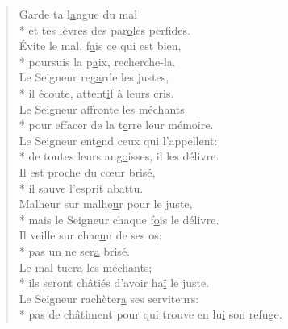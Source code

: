 \begin{verse}
Garde ta l\underline{a}ngue du mal \\*
et tes lèvres des par\underline{o}les perfides. \\
Évite le mal, f\underline{a}is ce qui est bien, \\*
poursuis la p\underline{a}ix, recherche-la. \\

Le Seigneur reg\underline{a}rde les justes, \\*
il écoute, attent\underline{i}f à leurs cris. \\
Le Seigneur affr\underline{o}nte les méchants \\*
pour effacer de la t\underline{e}rre leur mémoire. \\

Le Seigneur ent\underline{e}nd ceux qui l’appellent: \\*
de toutes leurs ang\underline{o}isses, il les délivre. \\
Il est proche du cœur brisé, \\*
il sauve l’espr\underline{i}t abattu. \\

Malheur sur malhe\underline{u}r pour le juste, \\*
mais le Seigneur chaque f\underline{o}is le délivre. \\
Il veille sur chac\underline{u}n de ses os: \\*
pas un ne ser\underline{a} brisé. \\

Le mal tuer\underline{a} les méchants; \\*
ils seront châtiés d’avoir ha\underline{ï} le juste. \\
Le Seigneur rachèter\underline{a} ses serviteurs: \\*
pas de châtiment pour qui trouve en lu\underline{i} son refuge. \\
\end{verse}

